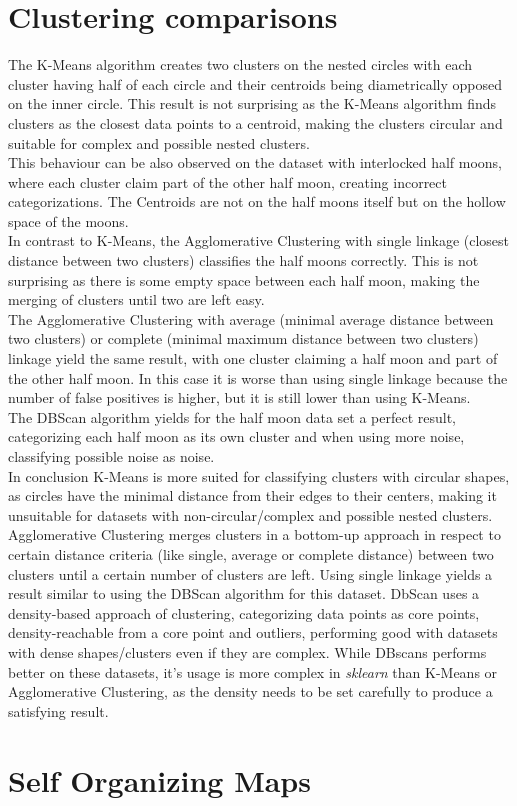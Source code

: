 \documentclass[a4paper, 11pt]{article}
\begin{document}
\section{Clustering comparisons}
The K-Means algorithm creates two clusters on the nested circles with each cluster having half of each circle and their centroids being diametrically opposed on the inner circle. This result is not surprising as the K-Means algorithm finds clusters as the closest data points to a centroid, making the clusters circular and suitable for complex and possible nested clusters.\\
This behaviour can be also observed on the dataset with interlocked half moons, where each cluster claim part of the other half moon, creating incorrect categorizations. The Centroids are not on the half moons itself but on the hollow space of the moons.\\
In contrast to K-Means, the Agglomerative Clustering with single linkage (closest distance between two clusters) classifies the half moons correctly. This is not surprising as there is some empty space between each half moon, making the merging of clusters until two are left easy.\\
The Agglomerative Clustering with average (minimal average distance between two clusters) or complete (minimal maximum distance between two clusters) linkage yield the same result, with one cluster claiming a half moon and part of the other half moon. In this case it is worse than using single linkage because the number of false positives is higher, but it is still lower than using K-Means.\\
The DBScan algorithm yields for the half moon data set a perfect result, categorizing each half moon as its own cluster and when using more noise, classifying possible noise as noise.\\
In conclusion K-Means is more suited for classifying clusters with circular shapes, as circles have the minimal distance from their edges to their centers, making it unsuitable for datasets with non-circular/complex and possible nested clusters. Agglomerative Clustering merges clusters in a bottom-up approach in respect to certain distance criteria (like single, average or complete distance) between two clusters until a certain number of clusters are left. Using single linkage yields a result similar to using the DBScan algorithm for this dataset.
DbScan uses a density-based approach of clustering, categorizing data points as core points, density-reachable from a core point and outliers, performing good with datasets with dense shapes/clusters even if they are complex. While DBscans performs better on these datasets, it's usage is more complex in \textit{sklearn} than K-Means or Agglomerative Clustering, as the density needs to be set carefully to produce a satisfying result.
\section{Self Organizing Maps}
\end{document}
